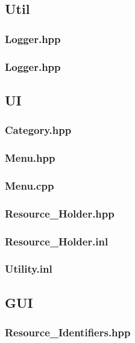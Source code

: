 \subsection{Util}
\subsubsection{Logger.hpp}

\subsubsection{Logger.hpp}


\subsection{UI}
\subsubsection{Category.hpp}

\subsubsection{Menu.hpp}

\subsubsection{Menu.cpp}

\subsubsection{Resource\_Holder.hpp}

\subsubsection{Resource\_Holder.inl}

\subsubsection{Utility.inl}


\subsection{GUI}
\subsubsection{Resource\_Identifiers.hpp}

